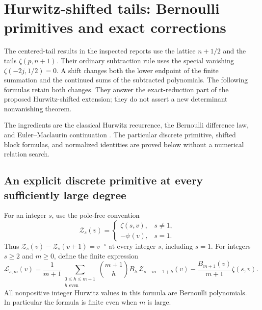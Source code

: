 \section{Hurwitz-shifted tails: Bernoulli primitives and exact corrections}
\label{sh:section}

The centered-tail results in the inspected reports use the lattice
$n+1/2$ and the tails $\zeta(p,n+1)$.  Their ordinary subtraction rule
uses the special vanishing $\zeta(-2j,1/2)=0$.  A shift changes both
the lower endpoint of the finite summation and the continued sums of
the subtracted polynomials.  The following formulas retain both changes.
They answer the exact-reduction part of the proposed Hurwitz-shifted
extension; they do not assert a new determinant nonvanishing theorem.

The ingredients are the classical Hurwitz recurrence, the Bernoulli
difference law, and Euler--Maclaurin continuation
\cite{DLMF,DLMFBernoulli}.  The particular discrete
primitive, shifted block formulas, and normalized identities are proved
below without a numerical relation search.

\subsection{An explicit discrete primitive at every sufficiently large degree}

For an integer $s$, use the pole-free convention
\[
 \mathcal Z_s(v)=
 \begin{cases}
  \zeta(s,v),&s\ne1,\\
  -\psi(v),&s=1.
 \end{cases}
\]
Thus $\mathcal Z_s(v)-\mathcal Z_s(v+1)=v^{-s}$ at every
integer $s$, including $s=1$.  For integers $s\ge2$ and $m\ge0$,
define the finite expression
\begin{equation}\label{sh:L}
 \mathcal L_{s,m}(v)=\frac1{m+1}
    \sum_{\substack{0\le h\le m+1\\h\text{ even}}}
       \binom{m+1}{h}B_h\,
       \mathcal Z_{s-m-1+h}(v)
       -\frac{B_{m+1}(v)}{m+1}\zeta(s,v).
\end{equation}
All nonpositive integer Hurwitz values in this formula are Bernoulli
polynomials.  In particular the formula is finite even when $m$ is large.

